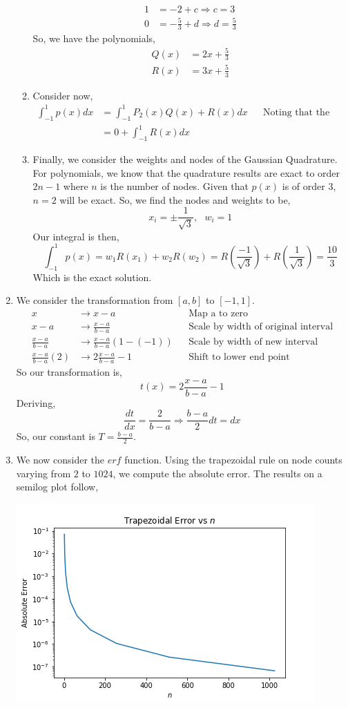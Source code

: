 \documentclass[letterpaper,10pt]{article}
\begin{document}
\begin{enumerate}
\begin{enumerate}
\begin{align*}
1 &= -2+c \Rightarrow c=3\\
0 &= -\frac{5}{3}+d \Rightarrow d=\frac{5}{3}
\end{align*}
So, we have the polynomials,
\begin{align*}
Q(x) &= 2x+\frac{5}{3} \\
R(x) &= 3x+\frac{5}{3}
\end{align*}
\item Consider now,
\begin{align*}
\int_{-1}^1p(x)dx &= \int_{-1}^1P_2(x)Q(x)+R(x)dx && \text{Noting that the first term is zero from part a}\\
&=0+\int_{-1}^1R(x)dx
\end{align*}
\item Finally, we consider the weights and nodes of the Gaussian Quadrature. For polynomials, we know that the quadrature results are exact to order $2n-1$ where $n$ is the number of nodes. Given that $p(x)$ is of order $3$, $n=2$ will be exact. So,
we find the nodes and weights to be,
\[x_i=\pm \frac{1}{\sqrt{3}},\ \ \ w_i=1\]
Our integral is then,
\[\int_{-1}^1p(x)=w_1R(x_1)+w_2R(w_2)=R\left(\frac{-1}{\sqrt{3}}\right)+R\left(\frac{1}{\sqrt{3}}\right)=\frac{10}{3}\]
Which is the exact solution.
\end{enumerate}
\item We consider the transformation from $[a,b]$ to $[-1,1]$.
\begin{align*}
x &\to x-a && \text{Map a to zero}\\
x-a &\to \frac{x-a}{b-a} && \text{Scale by width of original interval}\\
\frac{x-a}{b-a} &\to \frac{x-a}{b-a}(1-(-1)) && \text{Scale by width of new interval}\\
\frac{x-a}{b-a}(2) &\to 2\frac{x-a}{b-a} -1 && \text{Shift to lower end point}
\end{align*}
So our transformation is,
\[t(x)=2\frac{x-a}{b-a}-1\]
Deriving,
\[\frac{dt}{dx}=\frac{2}{b-a}\Rightarrow \frac{b-a}{2}dt=dx\]
So, our constant is $T=\frac{b-a}{2}$.
\item We now consider the $erf$ function. Using the trapezoidal rule on node counts varying from $2$ to $1024$, we compute the absolute error. The results on a semilog plot follow,
\begin{center}
\includegraphics[scale=.7]{10trap.png}

\end{center}
\end{enumerate}
\end{document}

